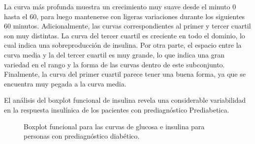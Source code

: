 La curva más profunda muestra un crecimiento muy suave desde el minuto 0 hasta el 60, para luego mantenerse con ligeras variaciones durante los siguientes 60 minutos. Adicionalmente, las curvas correspondientes al primer y tercer cuartil son muy distintas. La curva del tercer cuartil es creciente en todo el dominio, lo cual indica una sobreproducción de insulina. Por otra parte, el espacio entre la curva media y la del tercer cuartil es muy grande, lo que indica una gran variedad en el rango y la forma de las curvas dentro de este subconjunto. Finalmente, la curva del primer cuartil parece tener una buena forma, ya que se encuentra muy pegada a la curva media.

El análisis del boxplot funcional de insulina revela una considerable variabilidad en la respuesta insulínica de los pacientes con prediagnóstico Prediabetica. 


\begin{figure}[H]
 \centering
    \caption{Boxplot funcional para las curvas de glucosa e insulina para personas con prediagnóstico diabético.}
    \label{fig:bfDiabetes}
\end{figure}

